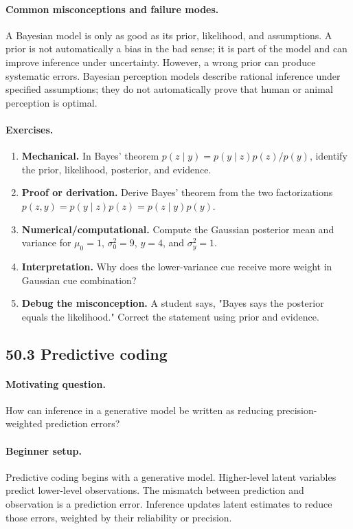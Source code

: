 \paragraph{Common misconceptions and failure modes.}
A Bayesian model is only as good as its prior, likelihood, and assumptions. A prior is not automatically a bias in the bad sense; it is part of the model and can improve inference under uncertainty. However, a wrong prior can produce systematic errors. Bayesian perception models describe rational inference under specified assumptions; they do not automatically prove that human or animal perception is optimal.

\paragraph{Exercises.}
\begin{enumerate}[label=\textbf{50.2.\arabic*.}, leftmargin=*]
\item \textbf{Mechanical.} In Bayes' theorem \(p(z\mid y)=p(y\mid z)p(z)/p(y)\), identify the prior, likelihood, posterior, and evidence.
\item \textbf{Proof or derivation.} Derive Bayes' theorem from the two factorizations \(p(z,y)=p(y\mid z)p(z)=p(z\mid y)p(y)\).
\item \textbf{Numerical/computational.} Compute the Gaussian posterior mean and variance for \(\mu_0=1\), \(\sigma_0^2=9\), \(y=4\), and \(\sigma_y^2=1\).
\item \textbf{Interpretation.} Why does the lower-variance cue receive more weight in Gaussian cue combination?
\item \textbf{Debug the misconception.} A student says, "Bayes says the posterior equals the likelihood." Correct the statement using prior and evidence.
\end{enumerate}

\subsection{50.3 Predictive coding}

\paragraph{Motivating question.}
How can inference in a generative model be written as reducing precision-weighted prediction errors?

\paragraph{Beginner setup.}
Predictive coding begins with a generative model. Higher-level latent variables predict lower-level observations. The mismatch between prediction and observation is a prediction error. Inference updates latent estimates to reduce those errors, weighted by their reliability or precision.

